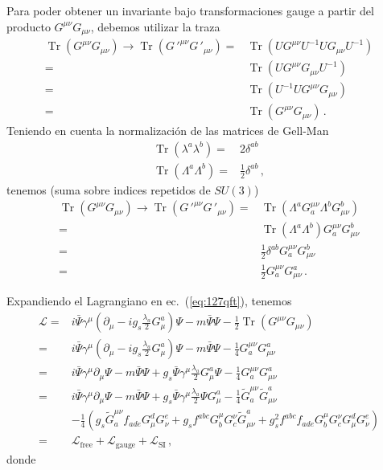 Para poder obtener un invariante bajo transformaciones gauge a partir del producto $G^{\mu\nu}G_{\mu\nu}$, debemos utilizar la traza 
\begin{align}
  \operatorname{Tr}\left(G^{\mu\nu}G_{\mu\nu}\right)\to
  \operatorname{Tr}\left({G\,'}^{\mu\nu}{G\,'}_{\mu\nu}\right)
  =&\operatorname{Tr}\left(U{{G}}^{\mu\nu}U^{-1}U{{G}}_{\mu\nu}U^{-1}\right)\nonumber\\
  =&\operatorname{Tr}\left(U{{G}}^{\mu\nu}{{G}}_{\mu\nu}U^{-1}\right)\nonumber\\
  =&\operatorname{Tr}\left(U^{-1}U{{G}}^{\mu\nu}{{G}}_{\mu\nu}\right)\nonumber\\
  =&\operatorname{Tr}\left({{G}}^{\mu\nu}{{G}}_{\mu\nu}\right)\,.
\end{align}
Teniendo en cuenta la normalización de las matrices de Gell-Man
\begin{align}
  \operatorname{Tr}\left(\lambda^a\lambda^b\right)=&2\delta^{ab}\nonumber\\
  \operatorname{Tr}\left(\Lambda^a\Lambda^b\right)=&\frac{1}{2}\delta^{ab}\,,
\end{align}
tenemos (suma sobre indices repetidos de $SU(3)$)
\begin{align}
  \operatorname{Tr}\left(G^{\mu\nu}G_{\mu\nu}\right)\to
  \operatorname{Tr}\left({G\,'}^{\mu\nu}{G\,'}_{\mu\nu}\right)
  =&\operatorname{Tr}\left(\Lambda^a{G}^{\mu\nu}_a \Lambda^b{G}_{\mu\nu}^b\right)\nonumber\\
  =&\operatorname{Tr}\left(\Lambda^a \Lambda^b\right){G}^{\mu\nu}_a {G}_{\mu\nu}^b\nonumber\\
  =&\frac{1}{2}\delta^{a b}{G}^{\mu\nu}_a {G}_{\mu\nu}^b\nonumber\\
  =&\frac{1}{2}{G}^{\mu\nu}_a {G}_{\mu\nu}^a\,.
\end{align}

Expandiendo el Lagrangiano en ec.~(\ref{eq:127qft}), tenemos
\begin{align}
  \mathcal{L}=&i\bar{\Psi}\gamma^\mu\left(\partial_\mu-i g_s\frac{\lambda_a}{2}G_\mu^a\right)\Psi
  -m\bar{\Psi}\Psi- \frac{1}{2}\operatorname{Tr}\left(G^{\mu\nu} G_{\mu\nu}\right)\nonumber\\
  =&i\bar{\Psi}\gamma^\mu\left(\partial_\mu-i g_s\frac{\lambda_a}{2}G_\mu^a\right)\Psi
  -m\bar{\Psi}\Psi- \frac{1}{4}G^{\mu\nu}_a G_{\mu\nu}^a\nonumber\\
=&i\bar{\Psi}\gamma^\mu\partial_\mu\Psi-m\bar{\Psi}\Psi+g_s\bar{\Psi}\gamma^\mu\frac{\lambda_a}{2}G_\mu^a\Psi
  - \frac{1}{4}G^{\mu\nu}_a G_{\mu\nu}^a\nonumber\\
=&i\bar{\Psi}\gamma^\mu\partial_\mu\Psi-m\bar{\Psi}\Psi+g_s\bar{\Psi}\gamma^\mu\frac{\lambda_a}{2}\Psi G_\mu^a
  - \frac{1}{4}\widetilde{G}^{\mu\nu}_a \widetilde{G}_{\mu\nu}^a\nonumber\\
  &- \frac{1}{4}\left(g_s\widetilde{G}^{\mu\nu}_af_{a d e}G^d_\mu G^e_\nu
    +g_sf^{a b c}G_b^\mu G_c^\nu\widetilde{G}_{\mu\nu}^a
    +g_s^2f^{a b c}f_{a d e}G_b^\mu G_c^\nu G^d_\mu G^e_\nu\right)\nonumber\\
=&\mathcal{L}_{\text{free}}+\mathcal{L}_{\text{gauge}}+\mathcal{L}_{\text{SI}}\,,
\end{align}
donde

